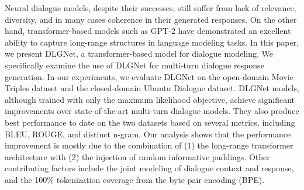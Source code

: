 Neural dialogue models, despite their successes, still suffer from lack of relevance, diversity, and in many cases coherence in their generated responses. On the other hand, transformer-based models such as GPT-2 have demonstrated an excellent ability to capture long-range structures in language modeling tasks.  In this paper, we present DLGNet, a transformer-based model for dialogue modeling. We specifically examine the use of DLGNet for multi-turn dialogue response generation. In our experiments, we evaluate DLGNet on the open-domain Movie Triples dataset and the closed-domain Ubuntu Dialogue dataset. DLGNet models, although trained with only the maximum likelihood objective, achieve significant improvements over state-of-the-art multi-turn dialogue models. They also produce best performance to date on the two datasets based on several metrics, including BLEU, ROUGE, and distinct n-gram. Our analysis shows that the performance improvement is mostly due to the combination of (1) the long-range transformer architecture with (2) the injection of random informative paddings. Other contributing factors include the joint modeling of dialogue context and response, and the 100\% tokenization coverage from the byte pair encoding (BPE).
